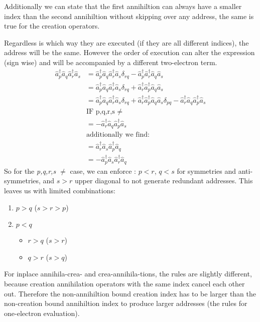 \documentclass[12p]{article}
\begin{document}
Additionally we can state that the first annihiltion can always have a smaller index than the second annihiltion without skipping over any address, the same is true for the creation operators.

Regardless is which way they are executed (if they are all different indices), the address will be the same. However the order of execution can alter the expression (sign wise) and will be accompanied by a different two-electron term.
\begin{align}
  \hat{a}^\dagger_p \hat{a}_q \hat{a}^\dagger_r \hat{a}_s & = \hat{a}^\dagger_p \hat{a}_q \hat{a}^\dagger_r \hat{a}_s \delta_{rq} - \hat{a}^\dagger_p \hat{a}^\dagger_r \hat{a}_q \hat{a}_s \\
  & = \hat{a}^\dagger_p \hat{a}_q \hat{a}^\dagger_r \hat{a}_s \delta_{rq} + \hat{a}^\dagger_r \hat{a}^\dagger_p \hat{a}_q \hat{a}_s \\
  & = \hat{a}^\dagger_p \hat{a}_q \hat{a}^\dagger_r \hat{a}_s \delta_{rq} + \hat{a}^\dagger_r \hat{a}^\dagger_p \hat{a}_q \hat{a}_s \delta_{pq} - \hat{a}^\dagger_r \hat{a}_q \hat{a}^\dagger_p \hat{a}_s \label{eq:equals} \\
  & \text{IF p,q,r,s $\neq$} \\
  & = -\hat{a}^\dagger_r \hat{a}_q \hat{a}^\dagger_p \hat{a}_s \\
  & \text{additionally we find:} \\
  & = \hat{a}^\dagger_r \hat{a}_s \hat{a}^\dagger_p \hat{a}_q \\
  & = -\hat{a}^\dagger_p \hat{a}_s \hat{a}^\dagger_r \hat{a}_q
\end{align}
So for the \textit{p,q,r,s $\neq$} case, we can enforce : $p<r$, $q<s$ for symmetries and anti-symmetries, and $s > r$ upper diagonal to not generate redundant addresses. This leaves us with limited combinations:
\begin{enumerate}
  \item $p > q$ ($s > r > p$)
  \item $p < q$
  \begin{itemize}
    \item $r > q$ ($s > r$)
    \item $q > r$ ($s > q$)
  \end{itemize}
\end{enumerate}

For inplace annihila-crea- and crea-annihila-tions, the rules are slightly different, because creation annihilation operators with the same index cancel each other out. Therefore the non-annihiltion bound creation index has to be larger than the non-creation bound annihiltion index to produce larger addresses (the rules for one-electron evaluation).
\end{document}
